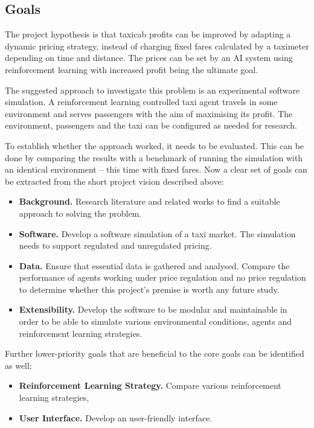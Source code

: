 \subsection{Goals}
\label{sec:intro:goals}

The project hypothesis is that taxicab profits can be improved by adapting a
dynamic pricing strategy, instead of charging fixed fares calculated by a
taximeter depending on time and distance. The prices can be set by an AI system
using reinforcement learning with increased profit being the ultimate goal.

The suggested approach to investigate this problem is an experimental software
simulation. A reinforcement learning controlled taxi agent travels in some
environment and serves passengers with the aim of maximising its profit. The
environment, passengers and the taxi can be configured as needed for research.

To establish whether the approach worked, it needs to be evaluated. This can be
done by comparing the results with a benchmark of running the simulation with
an identical environment -- this time with fixed fares. Now a clear set of
goals can be extracted from the short project vision described above:

\begin{itemize}
  \item \textbf{Background.} Research literature and related works to find a
        suitable approach to solving the problem.
  \item \textbf{Software.} Develop a software simulation of a taxi market. 
        The simulation needs to support regulated and unregulated pricing.
  \item \textbf{Data.} Ensure that essential data is gathered and analysed.
        Compare the performance of agents working under price regulation and no
        price regulation to determine whether this project's premise is worth
        any future study.
  \item \textbf{Extensibility.} Develop the software to be modular and
        maintainable in order to be able to simulate various environmental
        conditions, agents and reinforcement learning strategies.
\end{itemize}

Further lower-priority goals that are beneficial to the core goals can be
identified as well:

\begin{itemize}
  \item \textbf{Reinforcement Learning Strategy.} Compare various reinforcement
        learning strategies,
  \item \textbf{User Interface.} Develop an user-friendly interface.
\end{itemize}
